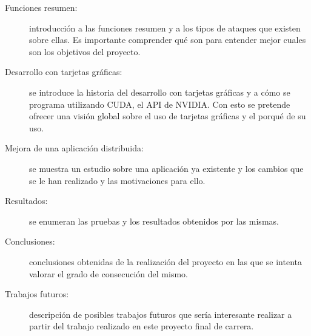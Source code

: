 \begin{description}
	\item[Funciones resumen:] introducción a las funciones resumen y a los tipos de ataques que existen sobre ellas. Es importante comprender qué son para entender mejor cuales son los objetivos del proyecto.
	
	\item[Desarrollo con tarjetas gráficas:] se introduce la historia del desarrollo con tarjetas gráficas y a cómo se programa utilizando CUDA, el API de NVIDIA. Con esto se pretende ofrecer una visión global sobre el uso de tarjetas gráficas y el porqué de su uso.
	
	\item[Mejora de una aplicación distribuida:] se muestra un estudio sobre una aplicación ya existente y los cambios que se le han realizado y las motivaciones para ello.
	
	\item[Resultados:] se enumeran las pruebas y los resultados obtenidos por las mismas.
	
	\item[Conclusiones:] conclusiones obtenidas de la realización del proyecto en las que se intenta valorar el grado de consecución del mismo.
	
	\item[Trabajos futuros:] descripción de posibles trabajos futuros que sería interesante realizar a partir del trabajo realizado en este proyecto final de carrera.
\end{description}